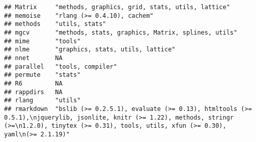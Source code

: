 \documentclass[
]{article}
\begin{document}
\begin{verbatim}
## Matrix     "methods, graphics, grid, stats, utils, lattice"                                                                                                                                                       
## memoise    "rlang (>= 0.4.10), cachem"                                                                                                                                                                            
## methods    "utils, stats"                                                                                                                                                                                         
## mgcv       "methods, stats, graphics, Matrix, splines, utils"                                                                                                                                                     
## mime       "tools"                                                                                                                                                                                                
## nlme       "graphics, stats, utils, lattice"                                                                                                                                                                      
## nnet       NA                                                                                                                                                                                                     
## parallel   "tools, compiler"                                                                                                                                                                                      
## permute    "stats"                                                                                                                                                                                                
## R6         NA                                                                                                                                                                                                     
## rappdirs   NA                                                                                                                                                                                                     
## rlang      "utils"                                                                                                                                                                                                
## rmarkdown  "bslib (>= 0.2.5.1), evaluate (>= 0.13), htmltools (>= 0.5.1),\njquerylib, jsonlite, knitr (>= 1.22), methods, stringr (>=\n1.2.0), tinytex (>= 0.31), tools, utils, xfun (>= 0.30), yaml\n(>= 2.1.19)"

\end{verbatim}
\end{document}
